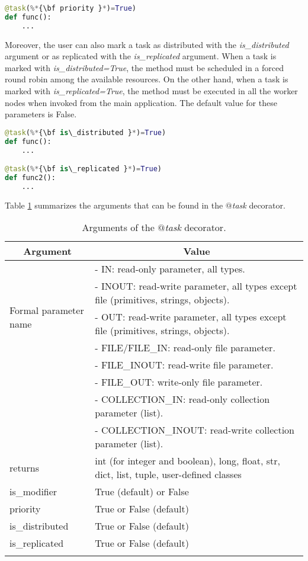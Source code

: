 \begin{lstlisting}[language=python]
@task(%*{\bf priority }*)=True)
def func():
    ...
\end{lstlisting}

Moreover, the user can also mark a task as distributed with the {\it is\_distributed} argument or as 
replicated with the {\it is\_replicated} argument. When a task is marked with {\it is\_distributed=True}, 
the method must be scheduled in a forced round robin among the available resources.
On the other hand, when a task is marked with {\it is\_replicated=True}, the method must be executed in 
all the worker nodes when invoked from the main application.
The default value for these parameters is False.

\begin{lstlisting}[language=python]
@task(%*{\bf is\_distributed }*)=True)
def func():
    ...

@task(%*{\bf is\_replicated }*)=True)
def func2():
    ...
\end{lstlisting}

Table \ref{tab:task_decorator_arguments} summarizes the arguments that can be found in the {\it $@$task} decorator.

\bgroup
  \def\arraystretch{1.5}%
  \begin{longtable}{| p{} | p{} |}
    \hline
    \multicolumn{1}{|c|}{{\bf Argument }}    &  \multicolumn{1}{c|}{{\bf Value }}\\
    \hline
    \multirow{5}{*}{Formal parameter name}  &  - IN: read-only parameter, all types. \\
    & - INOUT: read-write parameter, all types except file (primitives, strings, objects). \\
    & - OUT: read-write parameter, all types except file (primitives, strings, objects). \\
    & - FILE/FILE\_IN: read-only file parameter. \\
    & - FILE\_INOUT: read-write file parameter. \\
    & - FILE\_OUT: write-only file parameter. \\
    & - COLLECTION\_IN: read-only collection parameter (list). \\
    & - COLLECTION\_INOUT: read-write collection parameter (list). \\
    \hline
    returns & int (for integer and boolean), long, float, str, dict, list, tuple, user-defined classes \\
    \hline
    is\_modifier &  True (default) or False \\
    \hline
    priority  & True or False (default) \\
    \hline
    is\_distributed & True or False (default) \\
    \hline
    is\_replicated  & True or False (default) \\
    \hline
    \caption{Arguments of the {\it $@$task} decorator.}
    \label{tab:task_decorator_arguments}
  \end{longtable}
\egroup


